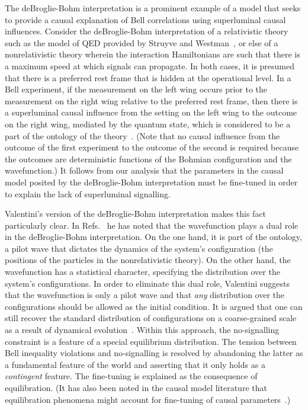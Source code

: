 \documentclass[letterpaper,onecolumn,nofootinbib]{revtex4}
\begin{document}
The deBroglie-Bohm interpretation is a prominent example of a model that seeks to provide a causal explanation of Bell correlations using superluminal causal influences. Consider the
deBroglie-Bohm interpretation of a relativistic theory such as the model of QED provided by Struyve
and Westman~\cite{Struyve2007}, or else of a nonrelativistic theory wherein the interaction
Hamiltonians are such that there is a maximum speed at which signals can
propagate.  In both cases, it is presumed that there is a preferred rest frame that is hidden at the operational level.
In a Bell experiment, if the measurement on the left wing occurs prior to the measurement on the right wing relative to the preferred rest frame, then there is a superluminal causal influence from the setting on the left wing to the outcome on the right wing, mediated by the
quantum state, which is considered to be a part of the ontology of the
theory~\cite{Bohm1993}.  (Note that no causal influence from the outcome of the first experiment to the
outcome of the second is required because the outcomes are deterministic functions of the Bohmian configuration and the wavefunction.) It follows from our analysis that the parameters in the causal model posited by the deBroglie-Bohm interpretation must be fine-tuned in order to explain the lack of superluminal signalling.

Valentini's version of the deBroglie-Bohm interpretation makes this fact
particularly clear. In Refs.~\cite{Valentini1991a,Valentini1991b} he has noted that the
wavefunction plays a dual role in the deBroglie-Bohm interpretation. On the
one hand, it is part of the ontology, a pilot wave that dictates the
dynamics of the system's configuration (the positions of the particles in
the nonrelativistic theory). On the other hand, the wavefunction has a statistical character, specifying the  distribution over the system's configurations. In order to
eliminate this dual role, Valentini suggests that the wavefunction is
only a pilot wave and that \emph{any} distribution over the configurations
should be allowed as the initial condition. It is argued that one
can still recover the standard distribution of configurations on a coarse-grained scale
as a result of  dynamical evolution~\cite{Valentini2008}. Within this approach, the no-signalling
constraint is a feature of a special equilibrium distribution.
The tension between Bell inequality violations and no-signalling is resolved
by abandoning the latter as a fundamental feature of the world and asserting
that it only holds as a \emph{contingent} feature. The fine-tuning is
explained as the consequence of equilibration. (It has also been noted in the
causal model literature that equilibration phenomena might account for fine-tuning of causal parameters~\cite{dash2005}.) 
\end{document}
